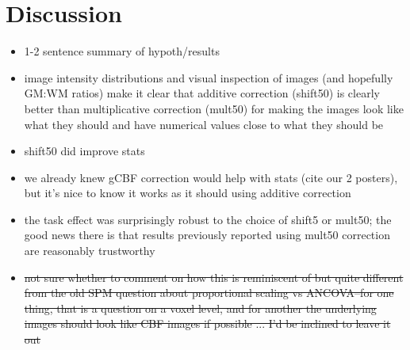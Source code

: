 \section{Discussion}

\begin{itemize}
\item 1-2 sentence summary of hypoth/results
\item image intensity distributions and visual inspection of images (and hopefully GM:WM ratios) make it clear that additive correction (shift50) is clearly better than multiplicative correction (mult50) for making the images look like what they should and have numerical values close to what they should be
\item shift50 did improve stats
\item we already knew gCBF correction would help with stats (cite our 2 posters),\cite{22789842} but it's nice to know it works as it should using additive correction
\item the task effect was surprisingly robust to the choice of shift5 or mult50; the good news there is that results previously reported using  mult50 correction are reasonably trustworthy
\item \sout{not sure whether to comment on how this is reminiscent of but quite different from the old SPM question about proportional scaling vs ANCOVA--for one thing, that is a question on a voxel level, and for another the underlying images should look like CBF images if possible ... I'd be inclined to leave it out}
\end{itemize}

